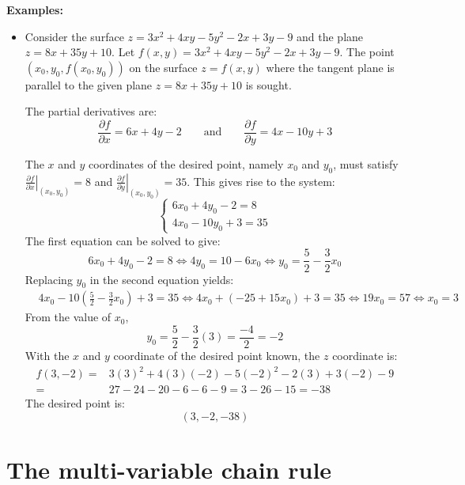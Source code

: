 \documentclass{article}
\begin{document}
\textbf{Examples:}
\begin{itemize}
\item Consider the surface \(z = 3x^2 + 4xy - 5y^2 - 2x + 3y - 9\) and the plane \(z = 8x + 35y + 10\). Let \(f(x, y) = 3x^2 + 4xy - 5y^2 - 2x + 3y - 9\). The point \((x_0, y_0, f(x_0, y_0))\) on the surface \(z = f(x, y)\) where the tangent plane is parallel to the given plane \(z = 8x + 35y + 10\) is sought. 

The partial derivatives are:
\[\frac{\partial f}{\partial x} = 6x + 4y - 2 \quad\quad\text{and}\quad\quad \frac{\partial f}{\partial y} = 4x - 10y + 3\]

The \(x\) and \(y\) coordinates of the desired point, namely \(x_0\) and \(y_0\), must satisfy \(\left.\frac{\partial f}{\partial x}\right|_{(x_0,y_0)} = 8\) and \(\left.\frac{\partial f}{\partial y}\right|_{(x_0,y_0)} = 35\). This gives rise to the system:   
\[\left\{\begin{array}{c}
6x_0 + 4y_0 - 2 = 8 \\ 
4x_0 - 10y_0 + 3 = 35
\end{array}\right.\]
The first equation can be solved to give:
\[6x_0 + 4y_0 - 2 = 8 \iff 4y_0 = 10 - 6x_0 \iff y_0 = \frac{5}{2} - \frac{3}{2}x_0\]
Replacing \(y_0\) in the second equation yields:
\begin{align*}
& 4x_0 - 10(\frac{5}{2} - \frac{3}{2}x_0) + 3 = 35 
\iff 4x_0 + (-25 + 15x_0) + 3 = 35 
\iff 19x_0 = 57 
\iff x_0 = 3 
\end{align*} 
From the value of \(x_0\), 
\[y_0 = \frac{5}{2} - \frac{3}{2}(3) = \frac{-4}{2} = -2\]
With the \(x\) and \(y\) coordinate of the desired point known, the \(z\) coordinate is:
\begin{align*}
f(3, -2) = & 3(3)^2 + 4(3)(-2) - 5(-2)^2 - 2(3) + 3(-2) - 9 \\ 
= & 27 - 24 - 20 - 6 - 6 - 9 
= 3 - 26 - 15 
= -38
\end{align*}
The desired point is:
\[(3, -2, -38)\]
\end{itemize}



\section*{The multi-variable chain rule}
\end{document}
